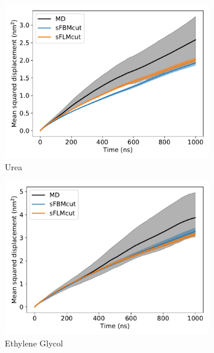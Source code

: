 \documentclass[12pt]{article}
\begin{document}
  \begin{figure}
  \centering
  \begin{subfigure}{0.45\textwidth}
  \includegraphics[width=\textwidth]{1mode_msd_comparison_URE.pdf}
  \caption{Urea}\label{fig:1mode_msd_comparison_URE}
  \end{subfigure}
  \begin{subfigure}{0.45\textwidth}
  \includegraphics[width=\textwidth]{1mode_msd_comparison_GCL.pdf}
  \caption{Ethylene Glycol}\label{fig:1mode_msd_comparison_GCL}
  \end{subfigure}
  \begin{subfigure}{0.45\textwidth}

\end{subfigure}
\end{figure}
\end{document}
